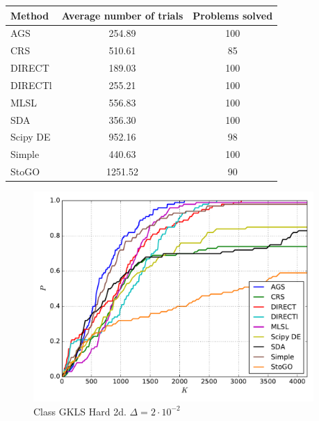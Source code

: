 \documentclass[a4paper]{article}
\begin{document}
\begin{tabular}{lcc}
\hline
 Method   &  Average number of trials  &  Problems solved  \\
\hline
 AGS      &           254.89           &        100        \\
 CRS      &           510.61           &        85         \\
 DIRECT   &           189.03           &        100        \\
 DIRECTl  &           255.21           &        100        \\
 MLSL     &           556.83           &        100        \\
 SDA      &           356.30           &        100        \\
 Scipy DE &           952.16           &        98         \\
 Simple   &           440.63           &        100        \\
 StoGO    &          1251.52           &        90         \\
\hline
\end{tabular}
\begin{figure}[H]
  \center
  \includegraphics[width=0.95\textwidth]{../experiments/gklsh2d/cmc.pdf}
  \caption{Class GKLS Hard 2d. $\Delta=2\cdot10^{-2}$}
\end{figure}
\end{document}
